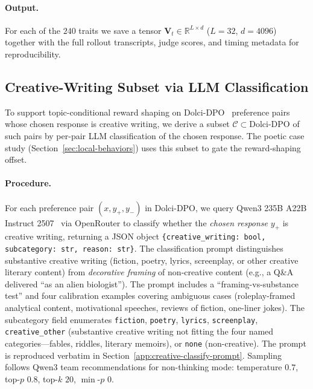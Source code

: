 \documentclass{article} %
\begin{document}
\paragraph{Output.}
For each of the $240$ traits we save a tensor
$\mathbf{V}_t \in \mathbb{R}^{L \times d}$ ($L{=}32$, $d{=}4096$)
together with the full rollout transcripts, judge scores, and timing
metadata for reproducibility. 




\subsection{Creative-Writing Subset via LLM Classification}
\label{app:creative-cluster}

To support topic-conditional reward shaping on
Dolci-DPO~\citep{olmo2025olmo} preference pairs whose chosen response
is creative writing, we derive a subset
$\mathcal{C} \subset \text{Dolci-DPO}$ of such pairs by per-pair LLM
classification of the chosen response. The poetic case study
(Section~\ref{sec:local-behaviors}) uses this subset to gate the
reward-shaping offset.

\paragraph{Procedure.}
For each preference pair $(x, y_+, y_-)$ in Dolci-DPO, we query
Qwen3 235B A22B Instruct 2507~\citep{yang2025qwen3} via OpenRouter to classify
whether the \emph{chosen response} $y_+$ is creative writing,
returning a JSON object
\texttt{\{creative\_writing: bool, subcategory: str, reason: str\}}.
The classification prompt distinguishes substantive creative writing
(fiction, poetry, lyrics, screenplay, or other creative literary
content) from \emph{decorative framing} of non-creative content (e.g.,
a Q\&A delivered ``as an alien biologist''). The prompt includes a
``framing-vs-substance test'' and four calibration examples covering
ambiguous cases (roleplay-framed analytical content, motivational
speeches, reviews of fiction, one-liner jokes). The subcategory field
enumerates \texttt{fiction}, \texttt{poetry}, \texttt{lyrics},
\texttt{screenplay}, \texttt{creative\_other} (substantive creative
writing not fitting the four named categories---fables, riddles,
literary memoirs), or \texttt{none} (non-creative). The prompt is
reproduced verbatim in Section~\ref{app:creative-classify-prompt}.
% 
Sampling follows Qwen3 team recommendations for non-thinking mode:
temperature $0.7$, top-$p$ $0.8$, top-$k$ $20$, $\min$-$p$ $0$.
\end{document}

